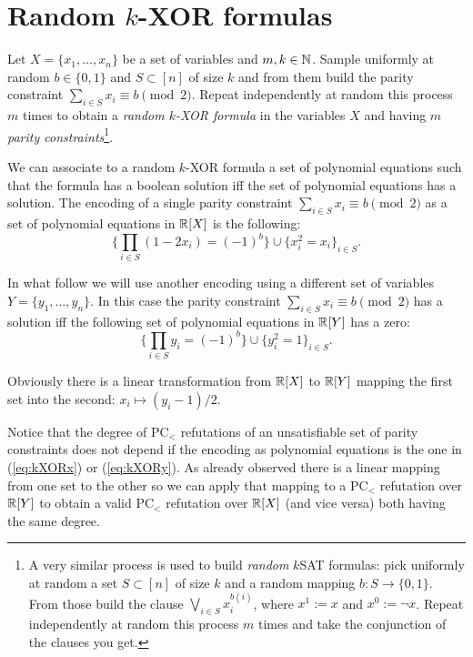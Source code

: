 \documentclass[a4paper,twoside,justified]{tufte-handout}
\begin{document}
\section{Random $k$-XOR formulas}

Let $X=\{x_1,\ldots,x_n\}$ be a set of variables and $m,k\in \mathbb{N}$. Sample uniformly at random $b\in \{0,1\}$ and $S\subset [n]$ of size $k$ and from them build the parity constraint $\sum_{i\in S}x_i \equiv b \pmod{2}$.
Repeat independently at random this process $m$ times to obtain a \emph{random $k$-XOR formula} in the variables $X$ and having $m$ \emph{parity constraints}\footnote{A very similar process is used to build \emph{random} $k$SAT formulas: pick uniformly at random a set $S\subset [n]$ of size $k$ and a random mapping $b:S\rightarrow \{0,1\}$. From those build the clause $\bigvee_{i\in S} x_i^{b(i)}$, where $x^1:=x$ and $x^0:=\neg x$. Repeat independently at random this process $m$ times and take the conjunction of the clauses you get.}. 

We can associate to a random $k$-XOR formula a set of polynomial equations such that the formula has a boolean solution iff the set of polynomial equations has a solution. 
The encoding of a single parity constraint $\sum_{i\in S}x_i \equiv b \pmod{2}$ as a set of polynomial equations in $\mathbb{R}[X]$ is the following:
\begin{equation}\label{eq:kXORx}
\{\prod_{i\in S}(1-2x_i) = (-1)^b \}\cup \{x_i^2=x_i\}_{i\in S}.
\end{equation} 

In what follow we will use another encoding using a different set of variables $Y=\{y_1,\ldots,y_n\}$.
 In this case the parity constraint $\sum_{i\in S}x_i  \equiv b \pmod{2}$ has a solution iff the following set of polynomial equations in $\mathbb{R}[Y]$ has a zero:
\begin{equation}\label{eq:kXORy}
\{\prod_{i\in S}y_i = (-1)^b \}\cup \{y_i^2=1\}_{i\in S}.
\end{equation} 

Obviously there is a linear transformation from $\mathbb{R}[X]$ to $\mathbb{R}[Y]$ mapping the first set into the second: $x_i\mapsto (y_i-1)/2$.

Notice that the degree of PC$_<$ refutations of an unsatisfiable set of parity constraints does not depend if the encoding as polynomial equations is the one in (\ref{eq:kXORx}) or (\ref{eq:kXORy}). 
As already observed there is a linear mapping from one set to the other so we can apply that mapping to a PC$_<$ refutation over $\mathbb{R}[Y]$ to obtain a valid PC$_<$ refutation over $\mathbb{R}[X]$ (and vice versa) both having the same degree.
\end{document}
